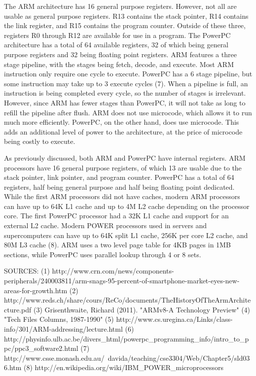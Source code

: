 \documentclass[letterpaper,10pt,onecolumn,titlepage]{article}
\begin{document}
\par
The ARM architecture has 16 general purpose registers. However, not all are usable as
general purpose registers. R13 contains the stack pointer, R14 contains the link register,
and R15 contains the program counter. Outside of these three, registers R0 through R12 are
available for use in a program. The PowerPC architecture has a total of 64 available
registers, 32 of which being general purpose registers and 32 being floating point
registers. ARM features a three stage pipeline, with the stages being fetch, decode, and
execute. Most ARM instruction only require one cycle to execute. PowerPC has a 6 stage 
pipeline, but some instruction may take up to 3 execute cycles (7). When a pipeline is full,
an instruction is being completed every cycle, so the number of stages is irrelevant.
However, since ARM has fewer stages than PowerPC, it will not take as long to refill the
pipeline after flush. ARM does not use microcode, which allows it to run much more
efficiently. PowerPC, on the other hand, does use microcode. This adds an additional level
of power to the architecture, at the price of microcode being costly to execute.

\par
As previously discussed, both ARM and PowerPC have internal registers. ARM processors have
16 general purpose registers, of which 13 are usable due to the stack pointer, link
pointer, and program counter. PowerPC has a total of 64 registers, half being general
purpose and half being floating point dedicated. While the first ARM processors did not
have caches, modern ARM processors can have up to 64K L1 cache and up to 4M L2 cache
depending on the processor core. The first PowerPC processor had a 32K L1 cache and
support for an external L2 cache. Modern POWER processors used in servers and
supercomputers can have up to 64K split L1 cache, 256K per core L2 cache, and 80M L3
cache (8). ARM uses a two level page table for 4KB pages in 1MB sections, while PowerPC 
uses parallel lookup through 4 or 8 sets.
\par

\par


SOURCES:
(1) http://www.crn.com/news/components-peripherals/240003811/arm-snags-95-percent-of-smartphone-market-eyes-new-areas-for-growth.htm
(2) http://www.reds.ch/share/cours/ReCo/documents/TheHistoryOfTheArmArchitecture.pdf
(3) Grisenthwaite, Richard (2011). "ARMv8-A Technology Preview"
(4) "Tech Files Columns, 1987-1990"
(5) http://www.cs.uregina.ca/Links/class-info/301/ARM-addressing/lecture.html
(6) http://physinfo.ulb.ac.be/divers_html/powerpc_programming_info/intro_to_ppc/ppc3_software2.html
(7) http://www.csse.monash.edu.au/~davida/teaching/cse3304/Web/Chapter5/sld036.htm
(8) http://en.wikipedia.org/wiki/IBM_POWER_microprocessors
\end{document}
